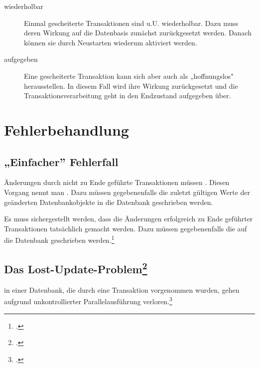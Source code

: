 \documentclass{lehramt-informatik-haupt}
\begin{document}
\begin{description}
\item[wiederholbar]

Einmal gescheiterte Transaktionen sind u.U. wiederholbar. Dazu muss
deren Wirkung auf die Datenbasis zunächst zurückgesetzt werden. Danach
können sie durch Neustarten wiederum aktiviert werden.

\item[aufgegeben]

Eine gescheiterte Transaktion kann sich aber auch als „hoffnungslos"
herausstellen. In diesem Fall wird ihre Wirkung zurückgesetzt und die
Transaktionsverarbeitung geht in den Endzustand aufgegeben über.
\end{description}

%

\section{Fehlerbehandlung}

%

\subsection{„Einfacher” Fehlerfall}

Änderungen durch nicht zu Ende geführte Transaktionen müssen
. Diesen Vorgang nennt man
. Dazu müssen gegebenenfalls die zuletzt gültigen Werte
der geänderten Datenbankobjekte in die Datenbank geschrieben werden.

Es muss sichergestellt werden, dass die Änderungen erfolgreich zu Ende
geführter Transaktionen tatsächlich  gemacht werden.
Dazu müssen gegebenenfalls die  auf die Datenbank geschrieben werden.\footcite[Seite
11]{db:fs:5}

%

\subsection{Das Lost-Update-Problem\footcite{wiki:verlorenes-update}}

 in einer Datenbank, die durch eine Transaktion
vorgenommen wurden, gehen aufgrund unkontrollierter Parallelausführung
verloren.\footcite[11.1.1 Verlorengegangenee Änderungen, Seite 332]{kemper}
\end{document}

